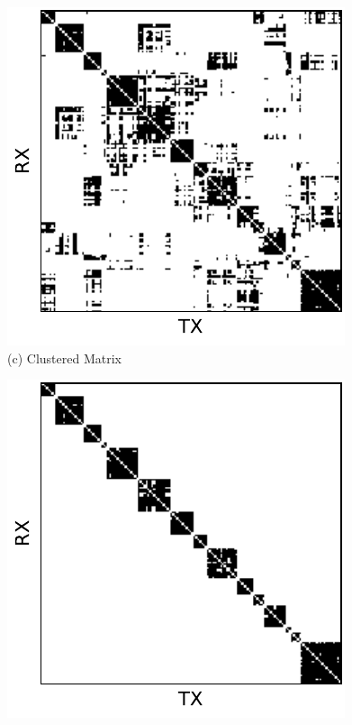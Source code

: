 \documentclass[conference]{IEEEtran}
\begin{document}
\begin{figure}[t!]
\begin{minipage}[b]{0.32\linewidth}
\begin{center}
    \end{center}
  \end{minipage}
  \begin{minipage}[b]{0.32\linewidth}
    \begin{center}
      \includegraphics[width=\textwidth]{images/sorted_matrix.pdf} \\
      {\footnotesize(c) Clustered Matrix}
    \end{center}
  \end{minipage}
  \begin{minipage}[b]{0.32\linewidth}
    \begin{center}
      \includegraphics[width=\textwidth]{images/cluster_matrix.pdf} \\

\end{center}
\end{minipage}
\end{figure}
\end{document}
